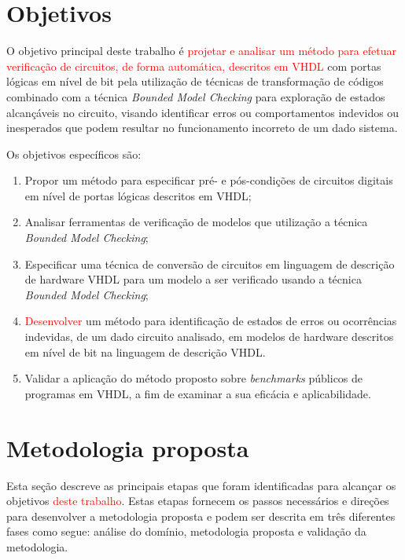 \section{Objetivos}
O objetivo principal deste trabalho é \textcolor{red}{projetar e analisar um método para efetuar verificação de circuitos, de forma automática, descritos em VHDL} com portas lógicas em nível de bit pela utilização de técnicas de transformação de códigos combinado com a técnica \textit{Bounded Model Checking} para exploração de estados alcançáveis no circuito, visando identificar erros ou comportamentos indevidos ou inesperados que podem resultar no funcionamento incorreto de um dado sistema.

Os objetivos específicos são:
\begin{enumerate}
  \item Propor um método para especificar pré- e pós-condições de circuitos digitais em nível de portas lógicas descritos em VHDL;
  \item Analisar ferramentas de verificação de modelos que utilização a técnica \textit{Bounded Model Checking};
  \item Especificar uma técnica de conversão de circuitos em linguagem de descrição de hardware VHDL para um modelo a ser verificado usando a técnica \textit{Bounded Model Checking};
   \item \textcolor{red}{Desenvolver} um método para identificação de estados de erros ou ocorrências indevidas, de um dado circuito analisado, em modelos de hardware descritos em nível de bit na linguagem de descrição VHDL.
  \item Validar a aplicação do método proposto sobre \textit{benchmarks} públicos de programas em VHDL, a fim de examinar a sua eficácia e aplicabilidade.
\end{enumerate}

\section{Metodologia proposta}

Esta seção descreve as principais etapas que foram identificadas para alcançar os objetivos \textcolor{red}{deste trabalho}. Estas etapas fornecem os passos necessários e direções para desenvolver a metodologia proposta e podem ser descrita em três diferentes fases como segue: análise do domínio, metodologia proposta e validação da metodologia.

